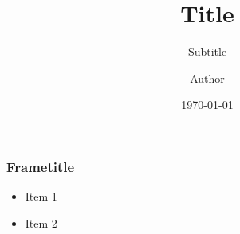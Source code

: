 \documentclass{beamer}
\title{Title}
\subtitle{Subtitle}
\author[Author]{Author}
\institute{Fakulta informačních technologií, VUT Brno}
\date{\today}
\begin{document}
\frame{\maketitle}

\begin{frame} \frametitle{Frametitle}

  \begin{itemize}
    \item Item 1
    \item Item 2
  \end{itemize}

\end{frame}
\end{document}
